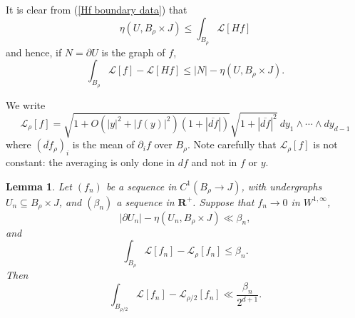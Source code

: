 \documentclass[reqno,12pt,letterpaper]{amsart}
\newcommand{\RR}{\mathbf{R}}
\newtheorem{lemma}[theorem]{Lemma}
\theoremstyle{definition}
\numberwithin{equation}{section}
\begin{document}
It is clear from (\ref{Hf boundary data}) that
$$\eta(U, B_\rho \times J) \leq \int_{B_\rho} \mathscr L[Hf]$$
and hence, if $N = \partial U$ is the graph of $f$,
$$\int_{B_\rho} \mathscr L[f] - \mathscr L[Hf] \leq |N| - \eta(U, B_\rho \times J).$$

We write
$$\mathscr L_\rho[f] = \sqrt{1 + O(|y|^2 + |f(y)|^2)(1 + |\overline{df}|)} \sqrt{1 + |\overline{df}|^2} ~dy_1 \wedge \cdots \wedge dy_{d - 1}$$
where $(\overline{df}_\rho)_i$ is the mean of $\partial_i f$ over $B_\rho$.
Note carefully that $\mathscr L_\rho[f]$ is not constant: the averaging is only done in $df$ and not in $f$ or $y$.

\begin{lemma}
Let $(f_n)$ be a sequence in $C^1(B_\rho \to J)$, with undergraphs $U_n \subseteq B_\rho \times J$, and $(\beta_n)$ a sequence in $\RR^+$. Suppose that $f_n \to 0$ in $W^{1, \infty}$,
$$|\partial U_n| - \eta(U_n, B_\rho \times J) \ll \beta_n,$$
and
$$\int_{B_\rho} \mathscr L[f_n] - \mathscr L_\rho[f_n] \leq \beta_n.$$
Then
$$\int_{B_{\rho/2}} \mathscr L[f_n] - \mathscr L_{\rho/2}[f_n] \ll \frac{\beta_n}{2^{d + 1}}.$$
\end{lemma}
\end{document}
